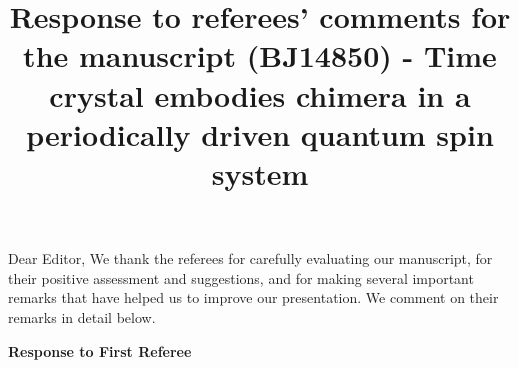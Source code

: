 \documentclass[aps,prb,reprint,showpacs,floatfix,superscriptaddress, onecolumn, 9pt]{revtex4-2}
\newcommand{\ar}[1]{{\color{blue}#1}} %
\begin{document}

\title{Response to referees’ comments for the manuscript (BJ14850) - Time crystal embodies chimera in a periodically driven quantum spin system}
\author{}

\maketitle

\noindent Dear Editor,
\vskip 0.5cm
We thank the referees for carefully evaluating our manuscript, for their positive assessment and suggestions, and for making several important remarks that have helped us to improve our presentation. We comment on their remarks in detail below.



\vspace{1em}

\noindent \textbf{Response to First Referee}
\end{document}
